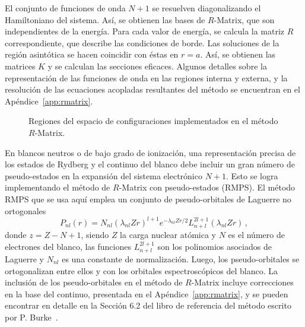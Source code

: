 El conjunto de funciones de onda $N+1$ se resuelven diagonalizando el
Hamiltoniano del sistema. Así, se obtienen las bases de $R$-Matrix, que 
son independientes de la energía. Para cada valor de energía, se calcula 
la matriz $R$ correspondiente, que describe las condiciones de borde.
Las soluciones de la región asintótica se hacen coincidir con éstas en 
$r=a$. Así, se obtienen las matrices $K$ y se calculan las secciones 
eficaces. Algunos detalles sobre la representación de las funciones de 
onda en las regiones interna y externa, y la resolución de las 
ecuaciones acopladas resultantes del método se encuentran en el 
Apéndice~\ref{app:rmatrix}.

\begin{figure}
\centering
{}
\vspace{0.5cm}
\caption{Regiones del espacio de configuraciones implementados en el 
método $R$-Matrix.}
\label{fig:rmatrix-regions}
\end{figure}

En blancos neutros o de bajo grado de ionización, una representación 
precisa de los estados de Rydberg y el continuo del blanco debe incluir 
un gran número de pseudo-estados en la expansión del sistema electrónico 
$N+1$. Esto se logra implementando el método de $R$-Matrix con 
pseudo-estados (RMPS). El método RMPS que se usa aquí
emplea un conjunto de pseudo-orbitales de Laguerre no ortogonales 
\begin{equation}
P_{nl}(r) = N_{nl}(\lambda_{nl}Zr)^{l+1} e^{-\lambda_{nl}Zr/2} 
L_{n+l}^{2l+1}(\lambda_{nl}Zr)\,,
\label{eq:pseudo}
\end{equation}
donde $z=Z-N+1$, siendo $Z$ la carga nuclear atómica y $N$ es el número 
de electrones del blanco, las funciones $L_{n+l}^{2l+1}$ son los 
polinomios asociados de Laguerre y $N_{nl}$ es una constante de 
normalización. Luego, los pseudo-orbitales se ortogonalizan entre ellos
y con los orbitales espectroscópicos del blanco. La inclusión de los 
pseudo-orbitales en el método de $R$-Matrix incluye correcciones en la 
base del continuo, presentada en el Apéndice~\ref{app:rmatrix}, y se 
pueden encontrar en detalle en la Sección 6.2 del libro de referencia 
del método escrito por P. Burke~\cite{Burke:11}.

